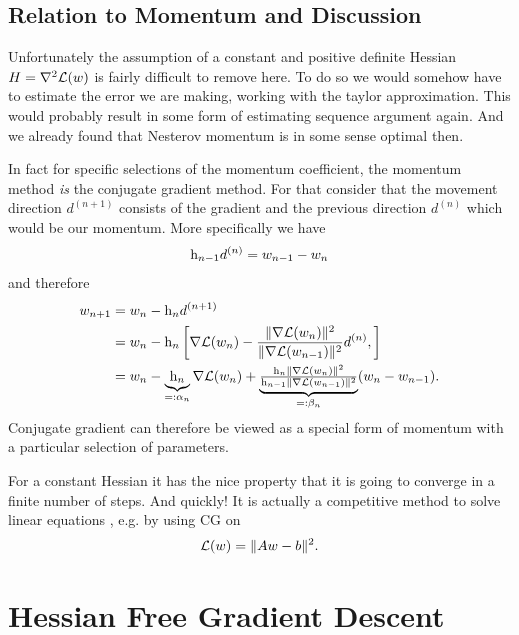 \subsection{Relation to Momentum and Discussion}

Unfortunately the assumption of a constant and positive definite Hessian
\(H=\nabla^2\mathcal{L}(w)\) is fairly difficult to remove here. To do so
we would somehow have to estimate the error we are making, working with the taylor
approximation. This would probably result in some form of estimating sequence
argument again. And we already found that Nesterov momentum is in some sense
optimal then.

In fact for specific selections of the momentum coefficient, the momentum method
\emph{is} the conjugate gradient method. For that consider that the movement
direction \(d^{(n+1)}\) consists of the gradient and the previous direction
\(d^{(n)}\) which would be our momentum. More specifically we have
\begin{align*}
	\text{h}_{n-1}d^{(n)} = w_{n-1} - w_n
\end{align*}
and therefore
\begin{align*}
	w_{n+1}
	&= w_n - \text{h}_n d^{(n+1)}\\
	&= w_n - \text{h}_n \left[
		\nabla\mathcal{L}(w_n)
		- \frac{\|\nabla\mathcal{L}(w_n)\|^2}{\|\nabla\mathcal{L}(w_{n-1})\|^2}
		d^{(n)},
	\right]\\
	&= w_n - \underbrace{\text{h}_n}_{=:\alpha_n} \nabla\mathcal{L}(w_n)
		+ \underbrace{\tfrac{\text{h}_n\|\nabla\mathcal{L}(w_n)\|^2}{\text{h}_{n-1}\|\nabla\mathcal{L}(w_{n-1})\|^2}}_{=:\beta_n}
		(w_n-w_{n-1}).
\end{align*}
Conjugate gradient can therefore be viewed as a special form of momentum with
a particular selection of parameters.

For a constant Hessian it has the nice property that it is going to converge in
a finite number of steps. And quickly! It is actually a competitive method to
solve linear equations \parencite[Section 10]{shewchukIntroductionConjugateGradient1994},
e.g. by using CG on
\begin{align*}
	\mathcal{L}(w) = \|Aw - b\|^2.
\end{align*}

\section{Hessian Free Gradient Descent}
\textcite{martensDeepLearningHessianfree2010}

